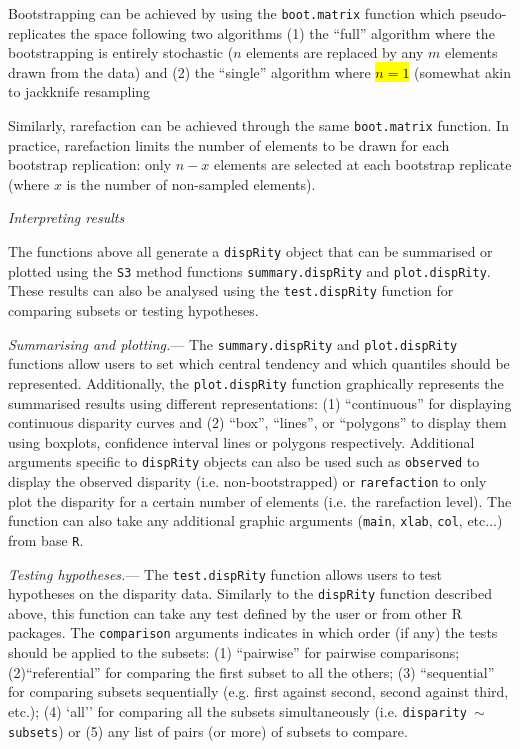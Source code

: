 \documentclass[12pt,letterpaper]{article}
\renewcommand{\subsection}[1]{%
\bigskip
\begin{center}
\begin{large}
\normalfont\itshape #1
\end{large}
\end{center}}
\renewcommand{\subsubsection}[1]{%
\vspace{2ex}
\noindent
\textit{#1.}---}
\newcommand{\disp}{\texttt{dispRity} }
\begin{document}
Bootstrapping can be achieved by using the \texttt{boot.matrix} function which pseudo-replicates the space following two algorithms (1) the ``full'' algorithm where the bootstrapping is entirely stochastic ($n$ elements are replaced by any $m$ elements drawn from the data) and (2) the ``single'' algorithm where \hl{$n = 1$} (somewhat akin to jackknife resampling

Similarly, rarefaction can be achieved through the same \texttt{boot.matrix} function.
In practice, rarefaction limits the number of elements to be drawn for each bootstrap replication: only $n-x$ elements are selected at each bootstrap replicate (where $x$ is the number of non-sampled elements).

\subsection{Interpreting results}
The functions above all generate a \disp object that can be summarised or plotted using the \texttt{S3} method functions \texttt{summary.dispRity} and \texttt{plot.dispRity}.
These results can also be analysed using the \texttt{test.dispRity} function for comparing subsets or testing hypotheses.

\subsubsection{Summarising and plotting}
The \texttt{summary.dispRity} and \texttt{plot.dispRity} functions allow users to set which central tendency and which quantiles should be represented.
Additionally, the \texttt{plot.dispRity} function graphically represents the summarised results using different representations: (1) ``continuous'' for displaying continuous disparity curves and (2) ``box'', ``lines'', or ``polygons'' to display them using boxplots, confidence interval lines or polygons respectively.
Additional arguments specific to \disp objects can also be used such as \texttt{observed} to display the observed disparity (i.e. non-bootstrapped) or \texttt{rarefaction} to only plot the disparity for a certain number of elements (i.e. the rarefaction level).
The function can also take any additional graphic arguments (\texttt{main}, \texttt{xlab}, \texttt{col}, etc...) from base \texttt{R}.

\subsubsection{Testing hypotheses}
The \texttt{test.dispRity} function allows users to test hypotheses on the disparity data.
Similarly to the \disp function described above, this function can take any test defined by the user or from other R packages.
The \texttt{comparison} arguments indicates in which order (if any) the tests should be applied to the subsets: (1) ``pairwise'' for pairwise comparisons; (2)``referential'' for comparing the first subset to all the others; (3) ``sequential'' for comparing subsets sequentially (e.g. first against second, second against third, etc.); (4) `all'' for comparing all the subsets simultaneously (i.e. \texttt{disparity $\mathtt{\sim}$ subsets}) or (5) any list of pairs (or more) of subsets to compare.
\end{document}
